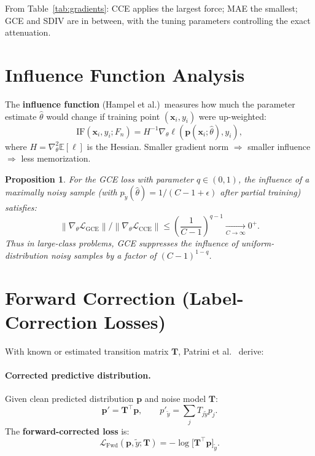 \documentclass[11pt,a4paper]{article}
\newtheorem{proposition}[theorem]{Proposition}
\newcommand{\E}{\mathbb{E}}
\newcommand{\Lcal}{\mathcal{L}}
\newcommand{\norm}[1]{\left\|#1\right\|}
\newcommand{\pb}{\mathbf{p}}
\newcommand{\xb}{\mathbf{x}}
\newcommand{\Tb}{\mathbf{T}}
\begin{document}
From Table~\ref{tab:gradients}: CCE applies the largest force; MAE the smallest;
GCE and SDIV are in between, with the tuning parameters controlling the exact attenuation.

\section{Influence Function Analysis}
\label{sec:influence}

The \textbf{influence function} (Hampel et al.)\ measures how much the parameter
estimate $\hat\theta$ would change if training point $(\xb_i, y_i)$ were up-weighted:
\[
  \mathrm{IF}(\xb_i, y_i; F_n) = H^{-1} \nabla_\theta \ell(\pb(\xb_i;\hat\theta), y_i),
\]
where $H = \nabla_\theta^2 \E[\ell]$ is the Hessian. Smaller gradient norm $\Rightarrow$
smaller influence $\Rightarrow$ less memorization.

\begin{proposition}
\label{prop:influence}
For the GCE loss with parameter $q \in (0,1)$, the influence of a maximally noisy sample
(with $p_{\tilde y}(\hat\theta) = 1/(C-1+\epsilon)$ after partial training) satisfies:
\[
  \norm{\nabla_\theta \Lcal_{\mathrm{GCE}}} / \norm{\nabla_\theta \Lcal_{\mathrm{CCE}}}
  \leq \left(\frac{1}{C-1}\right)^{q-1} \xrightarrow[C\to\infty]{} 0^+.
\]
Thus in large-class problems, GCE suppresses the influence of uniform-distribution
noisy samples by a factor of $(C-1)^{1-q}$.
\end{proposition}

\section{Forward Correction (Label-Correction Losses)}
\label{sec:forward}

With known or estimated transition matrix $\Tb$, Patrini et al.\ \cite{patrini2017} derive:

\paragraph{Corrected predictive distribution.}
Given clean predicted distribution $\pb$ and noise model $\Tb$:
\[
  \pb' = \Tb^\top \pb, \qquad p'_{\tilde y} = \sum_j T_{j\tilde y} p_j.
\]
The \textbf{forward-corrected loss} is:
\begin{equation}
  \label{eq:forwardT}
  \Lcal_{\mathrm{Fwd}}(\pb, \tilde y; \Tb) = -\log \big[\Tb^\top \pb\big]_{\tilde y}.
\end{equation}
\end{document}
